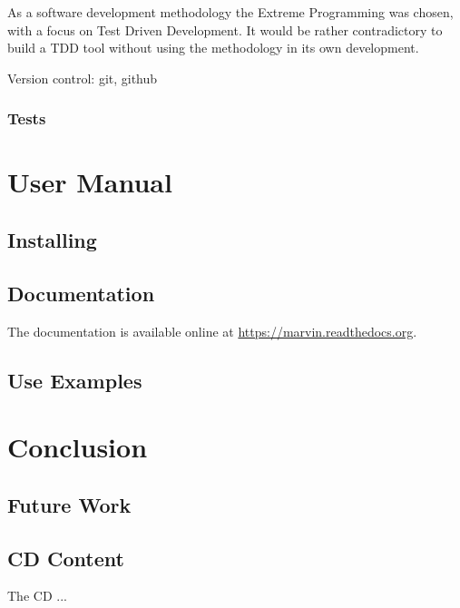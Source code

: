 \documentclass{report}
\begin{document}
As a software development methodology the Extreme Programming \cite{beck04} was chosen, with a focus on Test Driven
Development. It would be rather contradictory to build a TDD tool without using the methodology in its own development.


Version control: git, github

\subsection{Tests}

\chapter{User Manual}
\label{manual}

\section{Installing}


\section{Documentation}

The documentation is available online at \url{https://marvin.readthedocs.org}.

\section{Use Examples}

\chapter{Conclusion}
\label{conclusion}

\section{Future Work}

\begin{appendices}
\chapter{CD Content}

The CD ...

\end{appendices}



\end{document}
